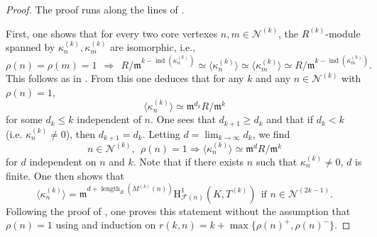 \documentclass[10pt,reqno]{amsart}
\numberwithin{equation}{section}
\theoremstyle{plain}
\theoremstyle{definition}
\theoremstyle{definition}
\theoremstyle{plain}
\theoremstyle{plain}
\theoremstyle{plain}
\theoremstyle{plain}
\theoremstyle{plain}
\theoremstyle{plain}
\DeclareMathOperator{\ord}{ord}
\newcommand{\ind}{\operatorname{ind}}
\DeclareMathOperator{\loc}{loc}
\DeclareMathOperator{\length}{length}
\newcommand{\CF}{\mathcal{F}}
\newcommand{\cL}{\mathcal{L}}
\newcommand{\cN}{\mathcal{N}}
\newcommand{\fm}{\mathfrak{m}}
\newcommand{\rH}{\mathrm{H}}
\begin{document}
\begin{proof}
The proof runs along the lines of 
 \cite[$\S$ 2.2]{zanarella}. 
 
 First, one shows that for every two core vertexes $n,m\in \cN^{(k)}$, the $R^{(k)}$-module spanned by $\kappa_n^{(k)},\kappa_m^{(k)}$ are isomorphic, i.e.,
\[
\rho(n)=\rho(m)=1 \ \ \Rightarrow \ \ R/\fm^{k-\ind(\kappa_n^{(k)})}\simeq \langle \kappa_n^{(k)} \rangle \simeq \langle \kappa_m^{(k)} \rangle\simeq R/\fm^{k-\ind(\kappa_m^{(k)})}.
\] 
This follows as in \cite[Cor. 2.2.13]{zanarella}. 
From this one deduces that for any $k$ and any $n\in \cN^{(k)}$ with $\rho(n)=1$,
\[
\langle \kappa_n^{(k)} \rangle \simeq \fm^{d_k} R/\fm^{k}
\]
for some $d_k\leq k$ independent of $n$. One sees that $d_{k+1}\geq d_k$ and that if $d_k<k$ (i.e. $\kappa_n^{(k)}\neq 0$), then $d_{k+1}=d_k$. Letting $d =\lim_{k\to\infty}d_k$, we find
\[
n\in \cN^{(k)}, \ \ \rho(n)=1 \Rightarrow \langle \kappa_n^{(k)} \rangle \simeq \fm^{d} R/\fm^{k}
\] 
for $d$ independent on $n$ and $k$. Note that if there exists $n$ such that $\kappa_n^{(k)}\neq 0$, $d$ is finite. One then shows that 
\begin{equation}\label{eq:span}
\langle\kappa_n^{(k)}\rangle = \fm^{d+ \length_R (M^{(k)}(n))}\rH^1_{\CF(n)}(K,T^{(k)}) \ \ \text{if $n\in \cN^{(2k-1)}$}.
\end{equation}
Following the proof of \cite[Lemma 2.3.1]{zanarella}, one proves this statement 
without the assumption that $\rho(n)=1$
using \cite[Lemma 1.6.4]{howard} and induction on $r(k,n)=k+\max\{\rho(n)^+,\rho(n)^-\}$. 
%
\end{proof}
\end{document}
